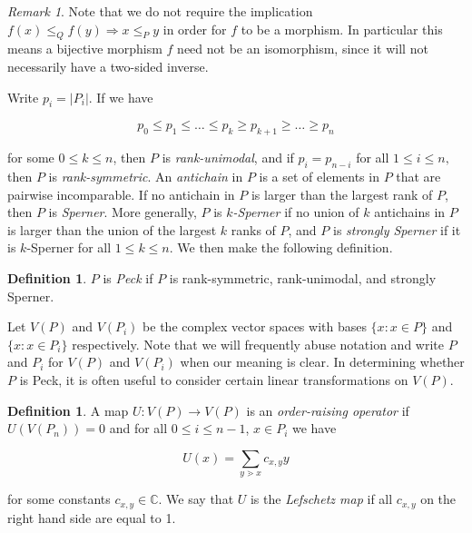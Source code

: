 \documentclass[10 pt]{amsart}
\theoremstyle{plain}
\theoremstyle{definition}
\newtheorem{defn}[thm]{Definition}
\theoremstyle{remark}
\newtheorem{rem}[thm]{Remark}
\numberwithin{equation}{section}
\begin{document}
\begin{rem}\label{rem:bijective_morphism_not_isomorphism}
Note that we do not require the implication $f(x)\le_Q f(y) \Rightarrow x\le_P y$ in order for $f$ to be a morphism.  In particular this means a bijective morphism $f$ need not be an isomorphism, since it will not necessarily have a two-sided inverse.  
\end{rem}

Write $p_i = |P_i|$.  If we have

$$p_0\le p_1\le \ldots \le p_k \ge p_{k+1} \ge\ldots \ge p_n$$

\noindent for some $0\le k\le n$, then $P$ is \textit{rank-unimodal}, and if $p_i = p_{n-i}$ for all $1\le i\le n,$ then $P$ is \textit{rank-symmetric}.  An \textit{antichain} in $P$ is a set of elements in $P$ that are pairwise incomparable.  If no antichain in $P$ is larger than the largest rank of $P$, then $P$ is \textit{Sperner}.  More generally, $P$ is \textit{$k$-Sperner} if no union of $k$ antichains in $P$ is larger than the union of the largest $k$ ranks of $P$, and $P$ is \textit{strongly Sperner} if it is $k$-Sperner for all $1\le k\le n$.  We then make the following definition.

\begin{defn}
$P$ is \textit{Peck} if $P$ is rank-symmetric, rank-unimodal, and strongly Sperner.
\end{defn}


Let $V(P)$ and $V(P_i)$ be the complex vector spaces with bases $\{x :x\in P\}$ and $\{x :x\in P_i\}$ respectively.  Note that we will frequently abuse notation and write $P$ and $P_i$ for $V(P)$ and $V(P_i)$ when our meaning is clear.  In determining whether $P$ is Peck, it is often useful to consider certain linear transformations on $V(P)$.

\begin{defn}
A map $U\colon V(P)\rightarrow V(P)$ is an \textit{order-raising operator} if $U(V(P_n)) = 0$ and for all $0\le i\le n-1$, $x\in P_i$ we have

$$U(x) = \sum_{y\gtrdot x} c_{x,y}y$$

\noindent for some constants $c_{x,y}\in \mathbb{C}$.  We say that $U$ is the \textit{Lefschetz map} if all $c_{x,y}$ on the right hand side are equal to 1.
\end{defn}
\end{document}
